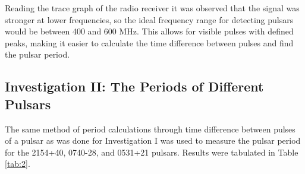 \documentclass[12pt]{article}
\begin{document}
Reading the trace graph of the radio receiver it was observed that the signal was stronger at lower frequencies, so the ideal frequency range for detecting pulsars would be between 400 and 600 MHz. This allows for visible pulses with defined peaks, making it easier to calculate the time difference between pulses and find the pulsar period.

\subsection{Investigation II: The Periods of Different Pulsars}

The same method of period calculations through time difference between pulses of a pulsar as was done for Investigation I was used to measure the pulsar period for the 2154+40, 0740-28, and 0531+21 pulsars. Results were tabulated in Table \ref{tab:2}.

\begin{table}[H]
    \centering
    \caption{Table of different pulsar periods with uncertainties and relative strengths.}
    \label{tab:2}
\end{table}
\end{document}
